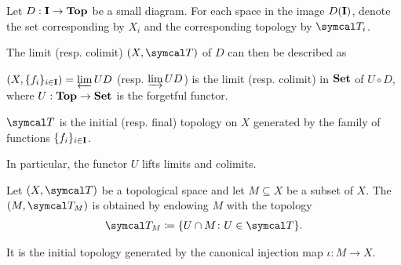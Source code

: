 \begin{proposition}\label{thm:initial_final_topology_limit}\cite{nLab:top}
  Let \( D: \operatorname{\mathbf{I}} \to \operatorname{\mathbf{Top}} \) be a small diagram. For each space in the image \( D(\operatorname{\mathbf{I}}) \), denote the set corresponding by \( X_i \) and the corresponding topology by \( \Cal{T}_i \).

  The limit (resp. colimit) \( (X, \Cal{T}) \) of \( D \) can then be described as
  \begin{defenum}
    \item \( (X, \{ f_i \}_{i \in \operatorname{\mathbf{I}}}) = \varprojlim UD \) (resp. \( \varinjlim UD \)) is the limit (resp. colimit) in \( \operatorname{\mathbf{Set}} \) of \( U \circ D \), where \( U: \operatorname{\mathbf{Top}} \to \operatorname{\mathbf{Set}} \) is the forgetful functor.
    \item \( \Cal{T} \) is the initial (resp. final) topology on \( X \) generated by the family of functions \( \{ f_i \}_{i \in \operatorname{\mathbf{I}}} \).
  \end{defenum}

  In particular, the functor \( U \) lifts limits and colimits.
\end{proposition}

\begin{definition}\label{def:topological_subspace}
  Let \( (X, \Cal{T}) \) be a topological space and let \( M \subseteq X \) be a subset of \( X \). The  \( (M, \Cal{T}_M) \) is obtained by endowing \( M \) with the topology
  \begin{align*}
    \Cal{T}_M \coloneqq \{ U \cap M \colon U \in \Cal{T} \}.
  \end{align*}

  It is the initial topology generated by the canonical injection map \( \iota: M \to X \).
\end{definition}

